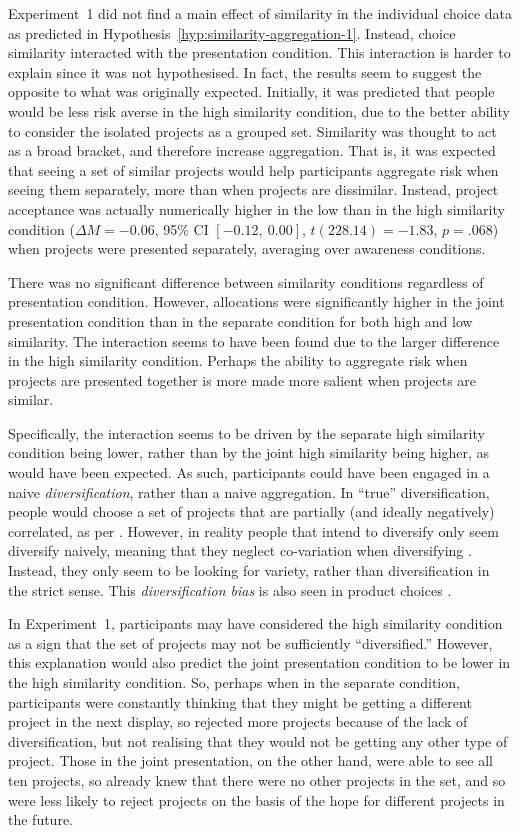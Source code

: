 \documentclass[a4paper, nobind, dvipsnames]{templates/ociamthesis}
\theoremstyle{definition}
\theoremstyle{definition}
\theoremstyle{definition}
\theoremstyle{definition}
\theoremstyle{remark}
\begin{document}
Experiment~1 did not find a main effect of similarity in the individual choice
data as predicted in Hypothesis~\ref{hyp:similarity-aggregation-1}. Instead,
choice similarity interacted with the presentation condition. This interaction
is harder to explain since it was not hypothesised. In fact, the results seem to
suggest the opposite to what was originally expected. Initially, it was
predicted that people would be less risk averse in the high similarity
condition, due to the better ability to consider the isolated projects as a
grouped set. Similarity was thought to act as a broad bracket, and therefore
increase aggregation. That is, it was expected that seeing a set of similar
projects would help participants aggregate risk when seeing them separately,
more than when projects are dissimilar. Instead, project acceptance was actually
numerically higher in the low than in the high similarity condition
(\(\Delta M = -0.06\), 95\% CI \([-0.12,~0.00]\), \(t(228.14) = -1.83\), \(p = .068\)) when projects were
presented separately, averaging over awareness conditions.

There was no significant difference between similarity conditions regardless of
presentation condition. However, allocations were significantly higher in the
joint presentation condition than in the separate condition for both high and
low similarity. The interaction seems to have been found due to the larger
difference in the high similarity condition. Perhaps the ability to aggregate
risk when projects are presented together is more made more salient when
projects are similar.

Specifically, the interaction seems to be driven by the separate high similarity
condition being lower, rather than by the joint high similarity being higher, as
would have been expected. As such, participants could have been engaged in a
naive \emph{diversification}, rather than a naive aggregation. In ``true''
diversification, people would choose a set of projects that are partially (and
ideally negatively) correlated, as per \textcite{markowitz1952}. However, in reality
people that intend to diversify only seem diversify naively, meaning that they
neglect co-variation when diversifying \autocite[e.g.,][]{hedesstrom2006}. Instead, they
only seem to be looking for variety, rather than diversification in the strict
sense. This \emph{diversification bias} is also seen in product choices \autocite{read1995}.

In Experiment~1, participants may have considered the high similarity condition
as a sign that the set of projects may not be sufficiently ``diversified.''
However, this explanation would also predict the joint presentation condition to
be lower in the high similarity condition. So, perhaps when in the separate
condition, participants were constantly thinking that they might be getting a
different project in the next display, so rejected more projects because of the
lack of diversification, but not realising that they would not be getting any
other type of project. Those in the joint presentation, on the other hand, were
able to see all ten projects, so already knew that there were no other projects
in the set, and so were less likely to reject projects on the basis of the hope
for different projects in the future.
\end{document}
